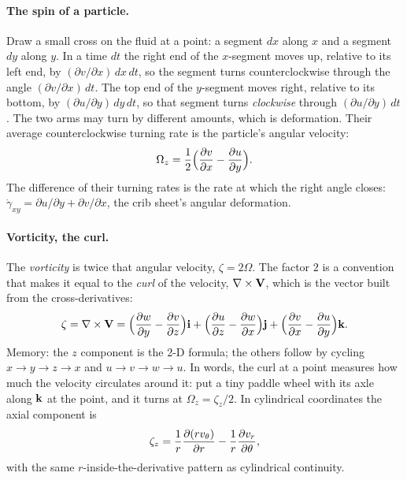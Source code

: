 \paragraph{The spin of a particle.} Draw a small cross on the fluid at a point: a segment $dx$ along $x$ and a segment $dy$ along $y$. In a time $dt$ the right end of the $x$-segment moves up, relative to its left end, by $(\partial v/\partial x)\,dx\,dt$, so the segment turns counterclockwise through the angle $(\partial v/\partial x)\,dt$. The top end of the $y$-segment moves right, relative to its bottom, by $(\partial u/\partial y)\,dy\,dt$, so that segment turns \emph{clockwise} through $(\partial u/\partial y)\,dt$. The two arms may turn by different amounts, which is deformation. Their average counterclockwise turning rate is the particle's angular velocity:
\[
\Omega_z = \frac12\Big(\frac{\partial v}{\partial x} - \frac{\partial u}{\partial y}\Big).
\]
The difference of their turning rates is the rate at which the right angle closes: $\dot\gamma_{xy} = \partial u/\partial y + \partial v/\partial x$, the crib sheet's angular deformation.

\paragraph{Vorticity, the curl.} The \emph{vorticity} is twice that angular velocity, $\zeta = 2\Omega$. The factor $2$ is a convention that makes it equal to the \emph{curl} of the velocity, $\nabla\times\mathbf{V}$, which is the vector built from the cross-derivatives:
\[
\zeta = \nabla\times\mathbf{V} = \Big(\frac{\partial w}{\partial y} - \frac{\partial v}{\partial z}\Big)\mathbf{i} + \Big(\frac{\partial u}{\partial z} - \frac{\partial w}{\partial x}\Big)\mathbf{j} + \Big(\frac{\partial v}{\partial x} - \frac{\partial u}{\partial y}\Big)\mathbf{k}.
\]
Memory: the $z$ component is the 2-D formula; the others follow by cycling $x \to y \to z \to x$ and $u \to v \to w \to u$. In words, the curl at a point measures how much the velocity circulates around it: put a tiny paddle wheel with its axle along $\mathbf{k}$ at the point, and it turns at $\Omega_z = \zeta_z/2$. In cylindrical coordinates the axial component is
\[
\zeta_z = \frac{1}{r}\frac{\partial (r v_\theta)}{\partial r} - \frac{1}{r}\frac{\partial v_r}{\partial \theta},
\]
with the same $r$-inside-the-derivative pattern as cylindrical continuity.

